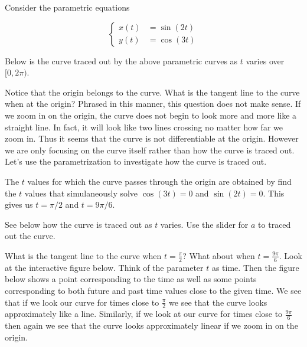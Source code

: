 \documentclass{ximera}
\begin{document}
\begin{example}

Consider the parametric equations 

\[ 
\begin{cases}
x(t)&=\sin(2t) \\
y(t)&=\cos(3t)
\end{cases}
\]

Below is the curve traced out by the above parametric curves as $t$ varies over $[0, 2\pi)$. 

\begin{image}
\end{image}

Notice that the origin belongs to the curve. What is the tangent line to the curve when at the origin?  Phrased in this manner, this question does not make sense. If we zoom in on
the origin, the curve does not begin to look more and more like a straight line. In fact, it will look like two lines crossing no matter how far we zoom in. Thus it seems that the curve is not differentiable at the origin. However we are only focusing on the curve itself rather than how the curve is traced out. Let's use the parametrization to investigate how the curve is traced out. 

The $t$ values for which the curve passes through the origin are obtained by find the $t$ values that simulaneously solve $\cos(3t)=0$ and $\sin(2t)=0$. 
This gives us $t=\pi/2$ and $t=9\pi/6$. 

See below how the curve is traced out as $t$ varies. Use the slider for $a$ to traced out the curve. 




What is the tangent line to the curve when $t=\frac{\pi}{2}$? What about when $t=\frac{9\pi}{6}$. Look at the interactive figure below. Think of the parameter $t$ as time. Then the figure below shows a point corresponding to the time as well as some points corresponding to both future and past time values close to the given time. We see that if we look our curve for times close to $\frac{\pi}{2}$ we see that the curve looks approximately like a line. Similarly, if we look at our curve for times close to $\frac{9\pi}{6}$ then again we see that the curve looks approximately linear if we zoom in on the origin.


\end{example}
\end{document}
